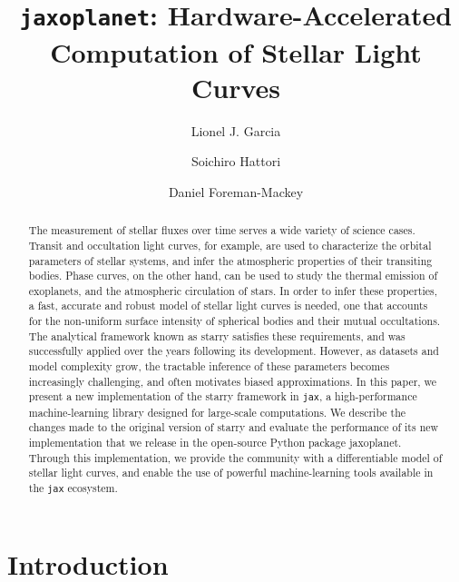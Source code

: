 \documentclass[modern]{aastex631}
\begin{document}
\title{\texttt{jaxoplanet}: Hardware-Accelerated Computation of Stellar Light Curves}

\author{Lionel J. Garcia}
\author{Soichiro Hattori}
\author{Daniel Foreman-Mackey}

\keywords{}

\begin{abstract}
    The measurement of stellar fluxes over time serves a wide variety of science cases. Transit and occultation light curves, for example, are used to characterize the orbital parameters of stellar systems, and infer the atmospheric properties of their transiting bodies. Phase curves, on the other hand, can be used to study the thermal emission of exoplanets, and the atmospheric circulation of stars. In order to infer these properties, a fast, accurate and robust model of stellar light curves is needed, one that accounts for the non-uniform surface intensity of spherical bodies and their mutual occultations. The analytical framework known as \textsf{starry} satisfies these requirements, and was successfully applied over the years following its development. However, as datasets and model complexity grow, the tractable inference of these parameters becomes increasingly challenging, and often motivates biased approximations. In this paper, we present a new implementation of the \textsf{starry} framework in \texttt{jax}, a high-performance machine-learning library designed for large-scale computations. We describe the changes made to the original version of \textsf{starry} and evaluate the performance of its new implementation that we release in the open-source Python package \textsf{jaxoplanet}. Through this implementation, we provide the community with a differentiable model of stellar light curves, and enable the use of powerful machine-learning tools available in the \texttt{jax} ecosystem. \gitlink{}

\end{abstract}

\section*{Introduction}


\end{document}
